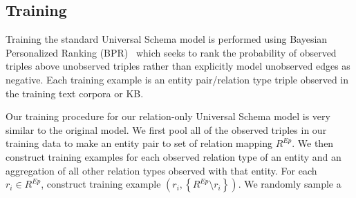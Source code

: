 \subsection {Training}
Training the standard Universal Schema model is performed using Bayesian Personalized Ranking (BPR)~\citep{rendle2009bpr} which seeks to rank the probability of observed triples above unobserved triples rather than explicitly model unobserved edges as negative.
Each training example is an entity pair/relation type triple observed in the training text corpora or KB.

Our training procedure for our relation-only Universal Schema model is very similar to the original model.
We first pool all of the observed triples in our training data to make an entity pair to set of relation mapping $R^{Ep}$.
We then construct training examples for each observed relation type of an entity and an aggregation of all other relation types observed with that entity.
For each $r_i \in R^{Ep}$, construct training example $(r_i, \left\{R^{Ep}\setminus r_i\right\})$.
We randomly sample a
